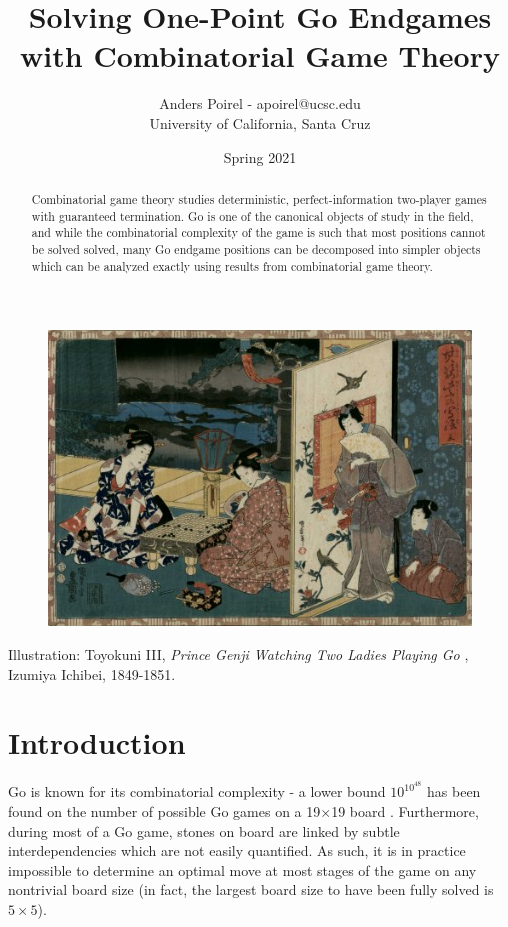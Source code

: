 \documentclass{article}
\title{Solving One-Point Go Endgames with Combinatorial Game Theory}
\author{Anders Poirel - apoirel@ucsc.edu \\ University of California, Santa Cruz}
\date{Spring 2021}
\theoremstyle{plain}
\theoremstyle{definition}
\begin{document}
\maketitle

\begin{figure}[ht]
    \centering
    \includegraphics[width=\textwidth]{prince_genji.jpg}
\end{figure}

\begin{abstract}
    Combinatorial game theory studies deterministic, perfect-information 
    two-player games with guaranteed termination. Go is one of the canonical objects of study 
    in the field, and while the combinatorial complexity of the game is such that most positions cannot 
    be solved solved, many Go endgame positions can be decomposed into simpler objects which can be
    analyzed exactly using results from combinatorial game theory.
\end{abstract}

\newpage

Illustration: Toyokuni III, \textit{Prince Genji Watching Two Ladies Playing Go }, 
Izumiya Ichibei, 1849-1851.

\tableofcontents
\newpage 
\section{Introduction}

Go is known for its combinatorial complexity - a lower bound $10^{10^{48}}$ has 
been found on the number of possible Go games on a 19$\times$19 board \cite{senseilower}. 
Furthermore, during most of a Go game, stones on board are linked by
 subtle interdependencies which are not easily quantified. As such, it is in practice impossible 
to determine an optimal move at most stages of the game on any nontrivial board size (in fact, the 
largest board size to have been fully solved is $5\times5$).
\end{document}
